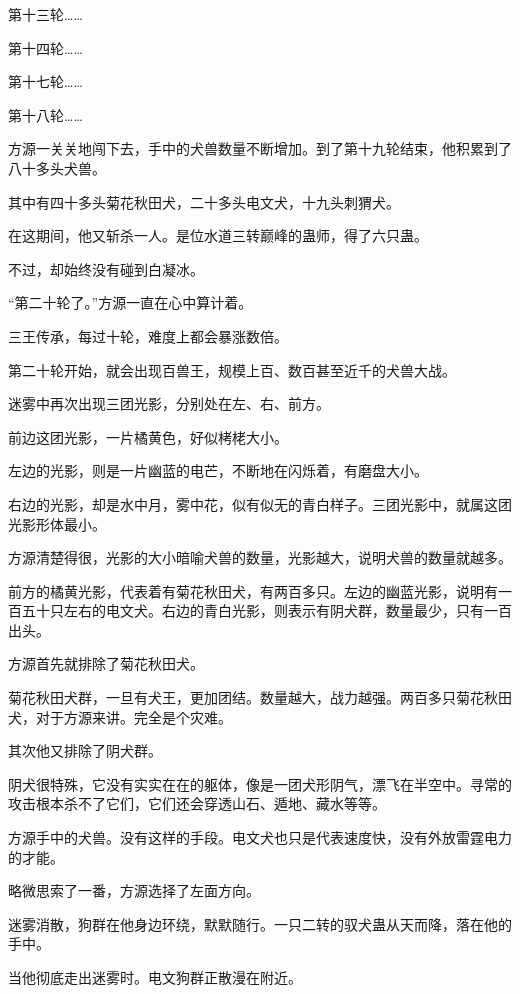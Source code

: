 
\begin{this_body}

第十三轮……

第十四轮……

第十七轮……

第十八轮……

方源一关关地闯下去，手中的犬兽数量不断增加。到了第十九轮结束，他积累到了八十多头犬兽。

其中有四十多头菊花秋田犬，二十多头电文犬，十九头刺猬犬。

在这期间，他又斩杀一人。是位水道三转巅峰的蛊师，得了六只蛊。

不过，却始终没有碰到白凝冰。

“第二十轮了。”方源一直在心中算计着。

三王传承，每过十轮，难度上都会暴涨数倍。

第二十轮开始，就会出现百兽王，规模上百、数百甚至近千的犬兽大战。

迷雾中再次出现三团光影，分别处在左、右、前方。

前边这团光影，一片橘黄色，好似栲栳大小。

左边的光影，则是一片幽蓝的电芒，不断地在闪烁着，有磨盘大小。

右边的光影，却是水中月，雾中花，似有似无的青白样子。三团光影中，就属这团光影形体最小。

方源清楚得很，光影的大小暗喻犬兽的数量，光影越大，说明犬兽的数量就越多。

前方的橘黄光影，代表着有菊花秋田犬，有两百多只。左边的幽蓝光影，说明有一百五十只左右的电文犬。右边的青白光影，则表示有阴犬群，数量最少，只有一百出头。

方源首先就排除了菊花秋田犬。

菊花秋田犬群，一旦有犬王，更加团结。数量越大，战力越强。两百多只菊花秋田犬，对于方源来讲。完全是个灾难。

其次他又排除了阴犬群。

阴犬很特殊，它没有实实在在的躯体，像是一团犬形阴气，漂飞在半空中。寻常的攻击根本杀不了它们，它们还会穿透山石、遁地、藏水等等。

方源手中的犬兽。没有这样的手段。电文犬也只是代表速度快，没有外放雷霆电力的才能。

略微思索了一番，方源选择了左面方向。

迷雾消散，狗群在他身边环绕，默默随行。一只二转的驭犬蛊从天而降，落在他的手中。

当他彻底走出迷雾时。电文狗群正散漫在附近。


\end{this_body}
